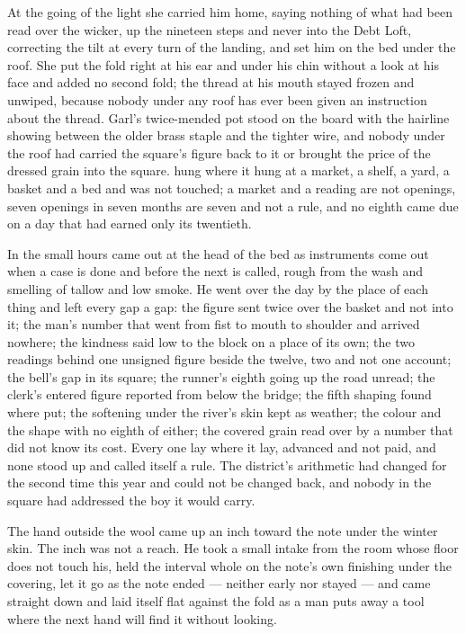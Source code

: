 At the going of the light she carried him home, saying nothing of what had been read over the wicker, up the nineteen steps and never into the Debt Loft, correcting the tilt at every turn of the landing, and set him on the bed under the roof. She put the fold right at his ear and under his chin without a look at his face and added no second fold; the thread at his mouth stayed frozen and unwiped, because nobody under any roof has ever been given an instruction about the thread. Garl's twice-mended pot stood on the board with the hairline showing between the older brass staple and the tighter wire, and nobody under the roof had carried the square's figure back to it or brought the price of the dressed grain into the square.  hung where it hung at a market, a shelf, a yard, a basket and a bed and was not touched; a market and a reading are not openings, seven openings in seven months are seven and not a rule, and no eighth came due on a day that had earned only its twentieth.

In the small hours  came out at the head of the bed as instruments come out when a case is done and before the next is called, rough from the wash and smelling of tallow and low smoke. He went over the day by the place of each thing and left every gap a gap: the figure sent twice over the basket and not into it; the man's number that went from fist to mouth to shoulder and arrived nowhere; the kindness said low to the block on a place of its own; the two readings behind one unsigned figure beside the twelve, two and not one account; the bell's gap in its square; the runner's eighth going up the road unread; the clerk's entered figure reported from below the bridge; the fifth shaping found where put; the softening under the river's skin kept as weather; the colour and the shape with no eighth of either; the covered grain read over by a number that did not know its cost. Every one lay where it lay, advanced and not paid, and none stood up and called itself a rule. The district's arithmetic had changed for the second time this year and could not be changed back, and nobody in the square had addressed the boy it would carry.

The hand outside the wool came up an inch toward the note under the winter skin. The inch was not a reach. He took a small intake from the room whose floor does not touch his, held the interval whole on the note's own finishing under the covering, let it go as the note ended --- neither early nor stayed --- and came straight down and laid itself flat against the fold as a man puts away a tool where the next hand will find it without looking.

